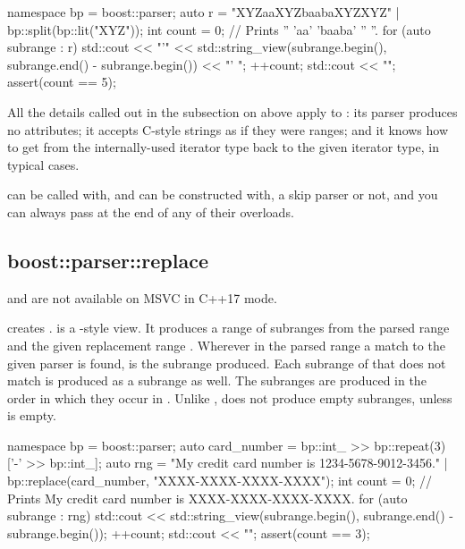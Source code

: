 \documentclass{MyBook}
\begin{document}
\begin{code}
namespace bp = boost::parser;
auto r = "XYZaaXYZbaabaXYZXYZ" | bp::split(bp::lit("XYZ"));
int count = 0;
// Prints '' 'aa' 'baaba' '' ''.
for (auto subrange : r) {
    std::cout << "'" << std::string_view(subrange.begin(), subrange.end() - subrange.begin()) << "' ";
    ++count;
}
std::cout << "\n";
assert(count == 5);
\end{code}

All the details called out in the subsection on  above apply to : its parser produces no attributes; it accepts C-style strings as if they were ranges; and it knows how to get from the internally-used iterator type back to the given iterator type, in typical cases.

 can be called with, and  can be constructed with, a skip parser or not, and you can always pass  at the end of any of their overloads.

\subsection{boost::parser::replace}

\begin{marker}[title=Important ]
 and  are not available on MSVC in C++17 mode. 
\end{marker}

 creates .  is a -style view. It produces a range of subranges from the parsed range  and the given replacement range . Wherever in the parsed range a match to the given parser  is found,  is the subrange produced. Each subrange of  that does not match  is produced as a subrange as well. The subranges are produced in the order in which they occur in . Unlike ,  does not produce empty subranges, unless  is empty.

\begin{code}
namespace bp = boost::parser;
auto card_number = bp::int_ >> bp::repeat(3)['-' >> bp::int_];
auto rng = "My credit card number is 1234-5678-9012-3456." | bp::replace(card_number, "XXXX-XXXX-XXXX-XXXX");
int count = 0;
// Prints My credit card number is XXXX-XXXX-XXXX-XXXX.
for (auto subrange : rng) {
    std::cout << std::string_view(subrange.begin(), subrange.end() - subrange.begin());
    ++count;
}
std::cout << "\n";
assert(count == 3);
\end{code}
\end{document}
